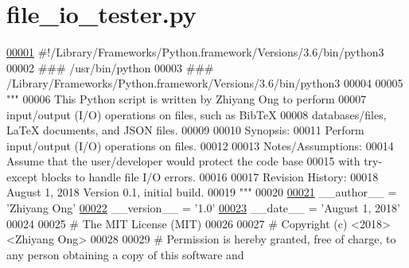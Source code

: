 \hypertarget{file__io__tester_8py_source}{}\section{file\+\_\+io\+\_\+tester.\+py}
\label{file__io__tester_8py_source}

\begin{DoxyCode}
\hypertarget{file__io__tester_8py_source_l00001}{}\hyperlink{namespaceutilities_1_1file__io__tester}{00001} \textcolor{comment}{#!/Library/Frameworks/Python.framework/Versions/3.6/bin/python3}
00002 \textcolor{comment}{### /usr/bin/python}
00003 \textcolor{comment}{### /Library/Frameworks/Python.framework/Versions/3.6/bin/python3}
00004 
00005 \textcolor{stringliteral}{"""}
00006 \textcolor{stringliteral}{    This Python script is written by Zhiyang Ong to perform}
00007 \textcolor{stringliteral}{        input/output (I/O) operations on files, such as BibTeX}
00008 \textcolor{stringliteral}{        databases/files, LaTeX documents, and JSON files.}
00009 \textcolor{stringliteral}{}
00010 \textcolor{stringliteral}{    Synopsis:}
00011 \textcolor{stringliteral}{    Perform input/output (I/O) operations on files.}
00012 \textcolor{stringliteral}{}
00013 \textcolor{stringliteral}{    Notes/Assumptions:}
00014 \textcolor{stringliteral}{    Assume that the user/developer would protect the code base}
00015 \textcolor{stringliteral}{        with try-except blocks to handle file I/O errors.}
00016 \textcolor{stringliteral}{}
00017 \textcolor{stringliteral}{    Revision History:}
00018 \textcolor{stringliteral}{    August 1, 2018          Version 0.1, initial build.}
00019 \textcolor{stringliteral}{"""}
00020 
\hypertarget{file__io__tester_8py_source_l00021}{}\hyperlink{namespaceutilities_1_1file__io__tester_a1e98e62ebd56ece4ec2a1b305f33aa72}{00021} \_\_author\_\_ = \textcolor{stringliteral}{'Zhiyang Ong'}
\hypertarget{file__io__tester_8py_source_l00022}{}\hyperlink{namespaceutilities_1_1file__io__tester_a18133e21b0a493dfcb0dcd31bd81a40e}{00022} \_\_version\_\_ = \textcolor{stringliteral}{'1.0'}
\hypertarget{file__io__tester_8py_source_l00023}{}\hyperlink{namespaceutilities_1_1file__io__tester_aff68b27f06e5ed552222d5e8ef71af1b}{00023} \_\_date\_\_ = \textcolor{stringliteral}{'August 1, 2018'}
00024 
00025 \textcolor{comment}{#   The MIT License (MIT)}
00026 
00027 \textcolor{comment}{#   Copyright (c) <2018> <Zhiyang Ong>}
00028 
00029 \textcolor{comment}{#   Permission is hereby granted, free of charge, to any person obtaining a copy of this software and
}
\end{DoxyCode}
